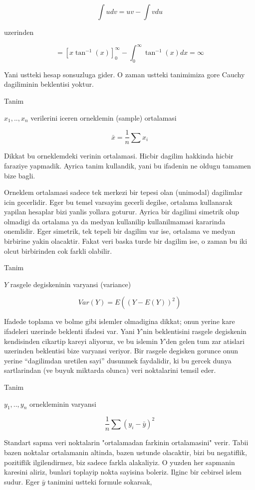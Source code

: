 \documentclass[12pt,fleqn]{article}\usepackage{../common}
\begin{document}
$$ \int udv = uv - \int vdu $$
 
uzerinden

$$ = [x \tan ^{-1}(x) ] _{ 0}^{\infty} - \int _{ 0}^{\infty} \tan ^{-1}(x)
dx  = \infty$$

Yani ustteki hesap sonsuzluga gider. O zaman ustteki tanimimiza gore Cauchy
dagiliminin beklentisi yoktur. 

Tanim

$x_1,..,x_n$ verilerini iceren orneklemin (sample) ortalamasi 

$$ \bar{x} = \frac{1}{n} \sum x_i$$

Dikkat bu orneklemdeki verinin ortalamasi. Hicbir dagilim hakkinda hicbir
faraziye yapmadik. Ayrica tanim kullandik, yani bu ifadenin ne oldugu
tamamen bize bagli. 

Orneklem ortalamasi sadece tek merkezi bir tepesi olan (unimodal)
dagilimlar icin gecerlidir. Eger bu temel varsayim gecerli degilse,
ortalama kullanarak yapilan hesaplar bizi yanlis yollara goturur. Ayrica
bir dagilimi simetrik olup olmadigi da ortalama ya da medyan kullanilip
kullanilmamasi kararinda onemlidir. Eger simetrik, tek tepeli bir dagilim
var ise, ortalama ve medyan birbirine yakin olacaktir. Fakat veri baska
turde bir dagilim ise, o zaman bu iki olcut birbirinden cok farkli
olabilir.


Tanim

$Y$ rasgele degiskeninin varyansi (variance) 

$$ Var(Y) = E((Y-E(Y))^2) $$

Ifadede toplama ve bolme gibi islemler olmadigina dikkat; onun yerine kare
ifadeleri uzerinde beklenti ifadesi var. Yani $Y$'nin beklentisini rasgele
degiskenin kendisinden cikartip kareyi aliyoruz, ve bu islemin $Y$'den
gelen tum zar atislari uzerinden beklentisi bize varyansi veriyor. Bir
rasgele degisken gorunce onun yerine ``dagilimdan uretilen sayi'' dusunmek
faydalidir, ki bu gercek dunya sartlarindan (ve buyuk miktarda olunca) veri
noktalarini temsil eder. 

Tanim

$y_1,..,y_n$ ornekleminin varyansi 

$$ \frac{1}{n} \sum (y_i - \bar{y})^2$$

Standart sapma veri noktalarin "ortalamadan farkinin ortalamasini"
verir. Tabii bazen noktalar ortalamanin altinda, bazen ustunde olacaktir,
bizi bu negatiflik, pozitiflik ilgilendirmez, biz sadece farkla
alakaliyiz. O yuzden her sapmanin karesini aliriz, bunlari toplayip nokta
sayisina boleriz. Ilginc bir cebirsel islem sudur. Eger $\bar{y}$ tanimini
ustteki formule sokarsak,
\end{document}
